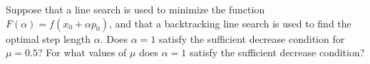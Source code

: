 Suppose that a line search is used to minimize the function $F(\alpha) = f(x_0 + \alpha p_0)$, and that a backtracking
line search is used to find the optimal step length $\alpha$. Does $\alpha = 1$ satisfy the sufficient decrease 
condition for $\mu = 0.5$? For what values of $\mu$ does $\alpha = 1$ satisfy the sufficient decrease condition?

\begin{solution}
    \ \\
    \vfill
\end{solution}
